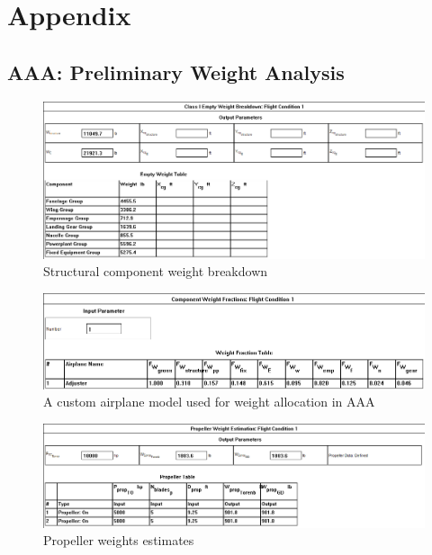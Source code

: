 \documentclass[conf]{new-aiaa}
\begin{document}
\section{Appendix}

\subsection{AAA: Preliminary Weight Analysis}
\begin{figure}[H]
    \includegraphics[width=\textwidth]{Report3Printouts/Weight/ComponentWeights_cropped.png}
    \caption{Structural component weight breakdown}
    \label{fig:componentweights}
\end{figure}

\begin{figure}[H]
    \includegraphics[width=\textwidth]{Report3Printouts/Weight/CustomAirplane_cropped.png}
    \caption{A custom airplane model used for weight allocation in AAA}
    \label{fig:customairplane}
\end{figure}

\begin{figure}[H]
    \includegraphics[width=\textwidth]{Report3Printouts/Weight/PropellerWeight_cropped.png}
    \caption{Propeller weights estimates}
    \label{fig:propellerweight}
\end{figure}
\end{document}
